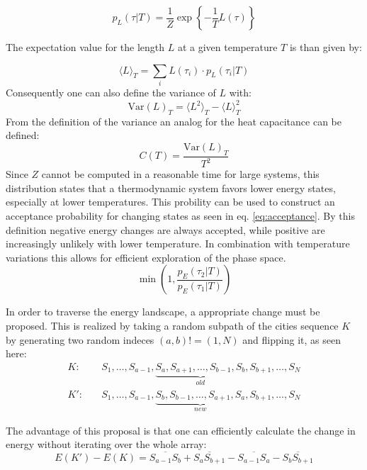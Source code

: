 \begin{equation}
    p_L(\tau | T) = \frac{1}{Z} \exp \left\{ -\frac{1}{T} L(\tau) \right\}
    \label{eq:prob_visit}
\end{equation}

The expectation value for the length $L$ at a given temperature $T$ is than given by:

\begin{equation}
    \langle L \rangle_T = \sum_i L(\tau_i) \cdot p_L(\tau_i | T)
    \label{eq:expect}
\end{equation}
Consequently one can also define the variance of $L$ with: 
\begin{equation}
    \textrm{Var}(L)_T = \langle L^2 \rangle_T - \langle L \rangle^2_T
    \label{eq:variance}
\end{equation}
From the definition of the variance an analog for the heat capacitance can be defined:
\begin{equation}
    C(T) = \frac{\textrm{Var}(L)_T}{ T^2}
    \label{eq:heat_cap}
\end{equation}
Since $Z$ cannot be computed in a reasonable time for large systems, this distribution states that a thermodynamic system favors lower energy states, especially at lower temperatures.
This probility can be used to construct an acceptance probability for changing states as seen in eq. \ref{eq:acceptance}.
By this definition negative energy changes are always accepted, while positive are increasingly unlikely with lower temperature.
In combination with temperature variations this allows for efficient exploration of the phase space.
\begin{equation}
    \min \left( 1, \frac{p_E(\tau_2|T)}{p_E(\tau_1|T)} \right)
    \label{eq:acceptance}
\end{equation}

\noindent In order to traverse the energy landscape, a appropriate change must be proposed.
This is realized by taking a random subpath of the cities sequence $K$ by generating two random indeces $(a,b) != (1,N)$ and flipping it, as seen here: 
\begin{align}
    K: &\quad S_1, \dots, S_{a-1}, \underbrace{S_a, S_{a+1}, \dots, S_{b-1}, S_b}_{\textit{old}}, S_{b+1}, \dots, S_N \\
    K': &\quad S_1, \dots, S_{a-1}, \underbrace{S_b, S_{b-1}, \dots, S_{a+1}, S_a}_{\textit{new}}, S_{b+1}, \dots, S_N 
\end{align}

\noindent The advantage of this proposal is that one can efficiently calculate the change in energy without iterating over the whole array:
\begin{equation}
    E(K') - E(K) = \overline{S_{a-1} S_b} + \overline{S_a S_{b+1}} - \overline{S_{a-1} S_a} - \overline{S_b S_{b+1}}
\end{equation}

